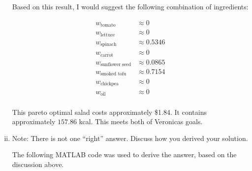 \documentclass[../main.tex]{subfiles}
\begin{document}
\begin{enumerate}[i.]
	Based on this result, I would suggest the following combination of ingredients:

	\begin{equation*}
		\begin{aligned}
			w_{\text{tomato}} &\approx 0 \\
			w_{\text{lettuce}} &\approx 0 \\
			w_{\text{spinach}} &\approx 0.5346 \\
			w_{\text{carrot}} &\approx 0 \\
			w_{\text{sunflower seed}} &\approx 0.0865 \\
			w_{\text{smoked tofu}} &\approx 0.7154 \\
			w_{\text{chickpea}} &\approx 0 \\
			w_{\text{oil}} &\approx 0 \\
		\end{aligned}
	\end{equation*}

	This pareto optimal salad costs approximately \$1.84. It contains approximately $157.86$ kcal. This meets both of Veronicas goals.

	\item Note: There is not one “right” answer. Discuss how you derived your solution.

	The following MATLAB code was used to derive the answer, based on the discussion above.

	


\end{enumerate}
\end{document}
